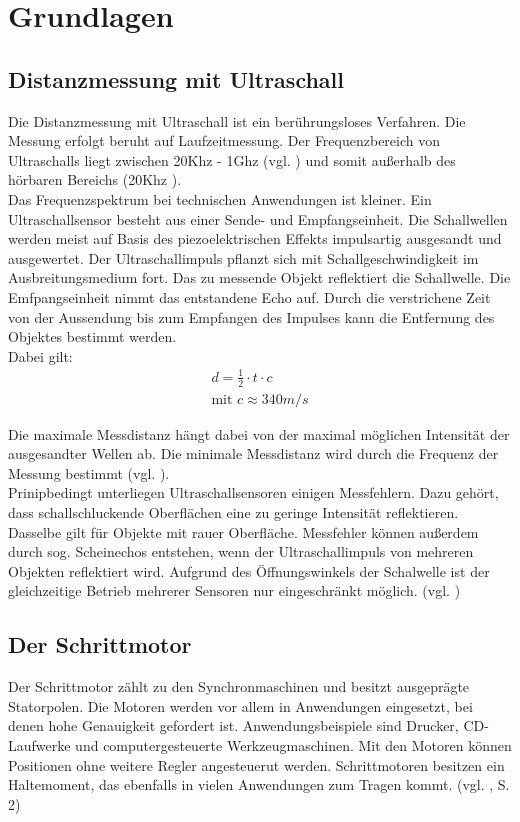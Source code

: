 \chapter{Grundlagen}
\section{Distanzmessung mit Ultraschall}
Die Distanzmessung mit Ultraschall ist ein berührungsloses Verfahren. Die Messung erfolgt beruht auf Laufzeitmessung. Der Frequenzbereich von Ultraschalls liegt zwischen 20Khz - 1Ghz (vgl. \cite{ultraschallbereich}) und somit außerhalb des hörbaren Bereichs (20Khz ). \\ Das Frequenzspektrum bei technischen Anwendungen ist kleiner. 
Ein Ultraschallsensor besteht aus einer Sende- und Empfangseinheit. Die Schallwellen werden meist auf Basis des piezoelektrischen Effekts impulsartig ausgesandt und ausgewertet.  Der Ultraschallimpuls pflanzt sich mit Schallgeschwindigkeit im Ausbreitungsmedium fort. Das zu messende Objekt reflektiert die Schallwelle. Die Emfpangseinheit nimmt das entstandene Echo auf. Durch die verstrichene Zeit von der Aussendung bis zum Empfangen des Impulses kann die Entfernung des Objektes bestimmt werden. \\

Dabei gilt:
\begin{align}
d = \frac{1}{2} \cdot t\cdot c\\
\text{mit }  c \approx 340m/s 
\end{align}

Die maximale Messdistanz hängt dabei von der maximal möglichen Intensität der ausgesandter Wellen ab. Die minimale Messdistanz wird durch die Frequenz der Messung bestimmt (vgl. \cite{ultraschallUni}). \\
Prinipbedingt unterliegen Ultraschallsensoren einigen Messfehlern. Dazu gehört, dass schallschluckende Oberflächen eine zu geringe Intensität reflektieren. Dasselbe gilt für Objekte mit rauer Oberfläche. Messfehler können außerdem durch sog. Scheinechos entstehen, wenn der Ultraschallimpuls von mehreren Objekten reflektiert wird. Aufgrund des Öffnungswinkels der Schalwelle ist der gleichzeitige Betrieb mehrerer Sensoren nur	 eingeschränkt möglich. (vgl. \cite{ultraschallBa})

\newpage
\section{Der Schrittmotor}
Der Schrittmotor zählt zu den Synchronmaschinen und besitzt ausgeprägte Statorpolen. Die Motoren werden vor allem in Anwendungen eingesetzt, bei denen hohe Genauigkeit gefordert ist. Anwendungsbeispiele sind Drucker, CD-Laufwerke und computergesteuerte Werkzeugmaschinen. Mit den Motoren können Positionen ohne weitere Regler angesteuerut werden. Schrittmotoren besitzen ein Haltemoment, das ebenfalls in vielen Anwendungen zum Tragen kommt. (vgl. \cite{schrittmotorBa}, S. 2)\\

